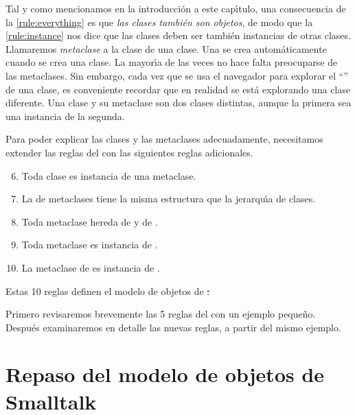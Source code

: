\documentclass[a4paper,10pt,twoside]{book}
\begin{document}
Tal y como mencionamos en la introducci\'on a este cap\'{\i}tulo, una consecuencia de la \ref{rule:everything} es que \emph{las clases tambi\'en son objetos}, de modo que la \ref{rule:instance} nos dice que las clases deben ser tambi\'en instancias de otras clases. Llamaremos \emph{metaclase} a la clase de una clase.
Una  se crea autom\'aticamente cuando se crea una clase. La mayor\'{\i}a de las veces no hace falta preocuparse de las metaclases. Sin embargo, cada vez que se usa el navegador para explorar el ``'' de una clase, es conveniente recordar que en realidad se está explorando una clase diferente. Una clase y su metaclase son dos clases distintas, aunque la primera sea una instancia de la segunda.

Para poder explicar las clases y las metaclases adecuadamente, necesitamos extender las reglas del  con las siguientes reglas adicionales.

\begin{enumerate}[label={\textbf{Rule \arabic{*}}.}, ref={Rule \arabic{*}}, leftmargin=*, widest=10]
\setcounter{enumi}{5}
\item{} 
  Toda clase es instancia de una metaclase.

\item{} 
  La  de metaclases tiene la misma estructura que la jerarqu\'{\i}a de clases.

\item{} 
  Toda metaclase hereda de  y de .

\item{} 
  Toda metaclase es instancia de .

\item{} 
  La metaclase de  es instancia de .

\end{enumerate}

\noindent
Estas 10 reglas definen el modelo de objetos de \st.

Primero revisaremos brevemente las 5 reglas del  con un ejemplo peque\~no. Despu\'es examinaremos en detalle las nuevas reglas, a partir del mismo ejemplo.

\section{Repaso del modelo de objetos de Smalltalk}
\end{document}
